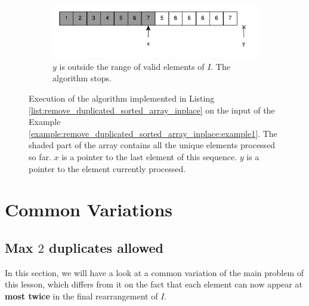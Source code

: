 \begin{figure}
\begin{subfigure}[t]{0.49\textwidth}
	 \end{subfigure}
	 \hfill
	 \begin{subfigure}[t]{0.49\textwidth}
		\includegraphics[width=1\linewidth]{sources/remove_duplicated_sorted_array_inplace/images/example1_15}
		\vspace*{-8mm}
		\caption{$y$ is outside the range of valid elements of $I$. The algorithm stops.}
		\label{fig:remove_duplicated_sorted_array_inplace:example1_6}
	 \end{subfigure}
\caption{Execution of the algorithm implemented in Listing
 \ref{list:remove_duplicated_sorted_array_inplace} on the input of the Example
 \ref{example:remove_duplicated_sorted_array_inplace:example1}. The shaded part of the array
 contains all the unique elements processed so far. $x$ is a pointer to the last element of this
 sequence. $y$ is a pointer to the element currently processed.}
\label{fig:remove_duplicated_sorted_array_inplace:example1_process}
\end{figure}

\section{Common Variations}
\subsection{Max $2$ duplicates allowed}
In this section, we will have a look at a common variation of the main problem of this lesson, which differs from it on the fact that each element can now appear at \textbf{most twice} in the final rearrangement of $I$.


